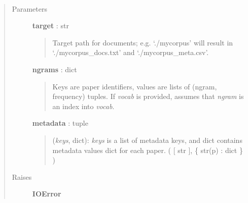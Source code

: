 \documentclass[letterpaper,10pt,english]{sphinxmanual}
\begin{document}
\begin{fulllineitems}
\label{tethne.writers.corpora:tethne.writers.corpora.to_documents}~\begin{quote}\begin{description}
\item[{Parameters}] \leavevmode
\textbf{target} : str
\begin{quote}

Target path for documents; e.g. `./mycorpus' will result in 
`./mycorpus\_docs.txt' and `./mycorpus\_meta.csv'.
\end{quote}

\textbf{ngrams} : dict
\begin{quote}

Keys are paper identifiers, values are lists of (ngram, frequency)
tuples. If \emph{vocab} is provided, assumes that \emph{ngram} is an index into
\emph{vocab}.
\end{quote}

\textbf{metadata} : tuple
\begin{quote}

(\emph{keys}, dict): \emph{keys} is a list of metadata keys, and dict contains
metadata values dict for each paper. ( {[} str {]}, \{ str(p) : dict \} )
\end{quote}

\item[{Raises}] \leavevmode
\textbf{IOError}

\end{description}\end{quote}

\end{fulllineitems}

\end{document}
